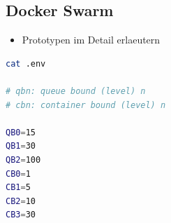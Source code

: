 \subsection{Docker Swarm}

\begin{itemize}
  \item Prototypen im Detail erlaeutern
\end{itemize}


\renewcommand\theadalign{bc}
\renewcommand\theadfont{\bfseries}
\renewcommand\theadgape{\Gape[4pt]}
\renewcommand\cellgape{\Gape[4pt]}


\begin{lstlisting}[language=bash]
cat .env

# qbn: queue bound (level) n
# cbn: container bound (level) n

QB0=15
QB1=30
QB2=100
CB0=1
CB1=5
CB2=10
CB3=30
\end{lstlisting}


